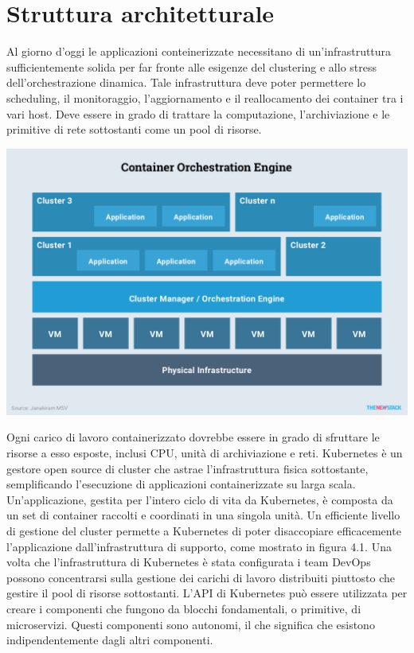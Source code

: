 \documentclass[12pt, a4paper]{report}
\begin{document}
\chapter{Struttura architetturale}
Al giorno d'oggi le applicazioni conteinerizzate necessitano di un'infrastruttura sufficientemente solida per far fronte alle esigenze del clustering e allo stress dell'orchestrazione dinamica. Tale infrastruttura deve poter permettere lo scheduling, il monitoraggio, l'aggiornamento e il reallocamento dei container tra i vari host. Deve essere in grado di trattare la computazione, l'archiviazione e le primitive di rete sottostanti come un pool di risorse.
\begin{center}
  \includegraphics[scale=0.5]{Images/Kubernetes-overview}
\end{center}
Ogni carico di lavoro containerizzato dovrebbe essere in grado di sfruttare le risorse a esso esposte, inclusi CPU, unità di archiviazione e reti.
Kubernetes è un gestore open source di cluster che astrae l'infrastruttura fisica sottostante, semplificando l'esecuzione di applicazioni containerizzate su larga scala. Un'applicazione, gestita per l'intero ciclo di vita da Kubernetes, è composta da un set di container raccolti e coordinati in una singola unità. Un efficiente livello di gestione del cluster permette a Kubernetes di poter disaccopiare efficacemente l'applicazione dall'infrastruttura di supporto, come mostrato in figura 4.1. Una volta che l'infrastruttura di Kubernetes è stata configurata i team DevOps possono concentrarsi sulla gestione dei carichi di lavoro distribuiti piuttosto che gestire il pool di risorse sottostanti.
L'API di Kubernetes può essere utilizzata per creare i componenti che fungono da blocchi fondamentali, o primitive, di microservizi. Questi componenti sono autonomi, il che significa che esistono indipendentemente dagli altri componenti.
\end{document}
